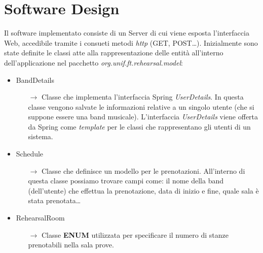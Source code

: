 \section{Software Design}

Il software implementato consiste di un Server di cui viene esposta l'interfaccia Web, accedibile tramite i consueti metodi \textsl{http} (GET, POST\dots).\newline
Inizialmente sono state definite le classi atte alla rappresentazione delle entità all'interno dell'applicazione nel pacchetto \textsl{org.unif.ft.rehearsal.model}:
\begin{itemize}
	\item BandDetails
		\begin{itemize}
			\item[$\rightarrow$] Classe che implementa l'interfaccia Spring \textsl{UserDetails}. In questa classe vengono salvate le informazioni relative a un singolo utente (che si suppone essere una band musicale). L'interfaccia \textsl{UserDetails} viene offerta da Spring come \textsl{template} per le classi che rappresentano gli utenti di un sistema.
		\end{itemize}
	\item Schedule
	\begin{itemize}
		\item[$\rightarrow$] Classe che definisce un modello per le prenotazioni. All'interno di questa classe possiamo trovare campi come: il nome della band (dell'utente) che effettua la prenotazione, data di inizio e fine, quale sala è stata prenotata\dots
	\end{itemize}
	\item RehearsalRoom
	\begin{itemize}
		\item[$\rightarrow$] Classe \textbf{ENUM} utilizzata per specificare il numero di stanze prenotabili nella sala prove.
	\end{itemize}
\end{itemize}

